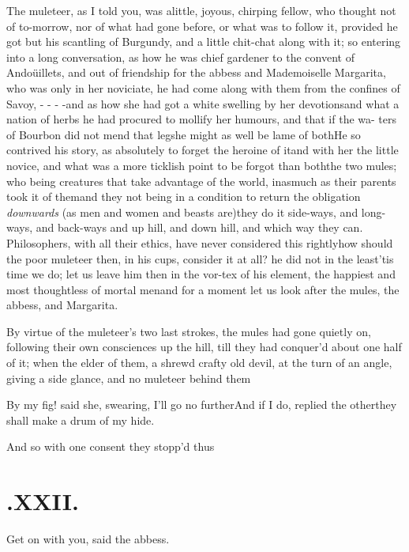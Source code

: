 \documentclass{article}
\begin{document}
The muleteer, as I told you, was a\break little, joyous,
chirping fellow, who thought not of to-morrow, nor of what had
gone before, or what was to follow it, provided he got but his
scantling of Burgundy, and a little chit-chat along with it; so
entering into a long conversation, as how he was chief gardener
to the convent of Andoüillets, \etc\etc and out of friendship
for the abbess and Mademoiselle Margarita, who was only in her
noviciate, he had come along with them from the confines of
Savoy, \etc - - \etc- -\break and as how she had got a white
swelling by her devotions\tsk and what a nation of herbs he had
procured to mollify her humours, \etc\etc and that if the wa-\pb
ters of Bourbon did not mend that leg\tsk she might as well be
lame of both\tsk \etc\etc\etc\tsk He so contrived his story, as
absolutely to forget the heroine of it\tsk and with her the
little novice, and what was a more ticklish point to be forgot
than both\tsk the two mules; who being creatures that take
advantage of the world, inasmuch as their parents took it of
them\tsk and they not being in a condition to return the
obligation \textit{downwards} (as men and women and beasts
are)\tsk they do it side-ways, and long-ways, and back-ways\tsk
and up hill, and down hill, and which way they can.\tsk
Philosophers, with all their ethics, have never considered this
rightly\tsk how should the poor muleteer then, in his cups,
consider it at all? he did not in the least\tsk ’tis time we do;
let us leave him then in the vor-\pb tex of his element, the happiest
and most thoughtless of mortal men\tsk and for a moment let us
look after the mules, the abbess, and Margarita.

By virtue of the muleteer’s two last strokes, the mules had
gone quietly on, following their own consciences up the hill, till
they had conquer’d about one half of it; when the elder of
them, a shrewd crafty old devil, at the turn of an angle, giving a
side glance, and no muleteer behind them\tsh

By my fig! said she, swearing, I’ll go\break
no further\tsh And if I do, replied the\break
other\tsk they shall make a drum of my\break
hide.\tsh

And so with one consent they stopp’d thus\tsh

\newpage
\section{.\enspace XXII.}

\quad\tsh Get on with you, said the abbess.
\end{document}
